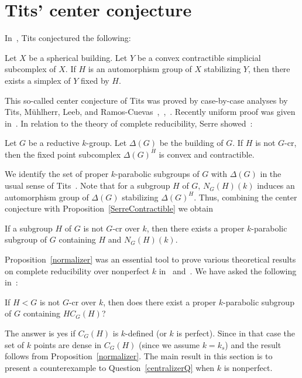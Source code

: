 \section{Tits' center conjecture}
In~\cite{Tits-colloq}, Tits conjectured the following:
\begin{con}\label{centerconjecture}
Let $X$ be a spherical building. Let $Y$ be a convex contractible simplicial subcomplex of $X$. If $H$ is an automorphism group of $X$ stabilizing $Y$, then there exists a simplex of $Y$ fixed by $H$.   
\end{con}
This so-called center conjecture of Tits was proved by case-by-case analyses by Tits, M\"{u}hlherr, Leeb, and Ramos-Cuevas~\cite{Leeb-Ramos-TCC-GFA},~\cite{Muhlherr-Tits-TCC-JAlgebra},~\cite{Ramos-centerconj-Geo}. Recently uniform proof was given in~\cite{Weiss-center-Fourier}. In relation to the theory of complete reducibility, Serre showed~\cite{Serre-building}:
\begin{prop}\label{SerreContractible}
Let $G$ be a reductive $k$-group. Let $\Delta(G)$ be the building of $G$. If $H$ is not $G$-cr, then the fixed point subcomplex $\Delta(G)^H$ is  convex and contractible. 
\end{prop}
We identify the set of proper $k$-parabolic subgroups of $G$ with $\Delta(G)$ in the usual sense of Tits~\cite{Tits-book}. Note that for a subgroup $H$ of $G$, $N_G(H)(k)$ induces an automorphism group of $\Delta(G)$ stabilizing $\Delta(G)^H$. Thus, combining the center conjecture with Proposition~\ref{SerreContractible} we obtain
\begin{prop}\label{normalizer}
If a subgroup $H$ of $G$ is not $G$-cr over $k$, then there exists a proper $k$-parabolic subgroup of $G$ containing $H$ and $N_G(H)(k)$. 
\end{prop}
Proposition~\ref{normalizer} was an essential tool to prove various theoretical results on complete reducibility over nonperfect $k$ in~\cite{Uchiyama-Nonperfectopenproblem-pre} and~\cite{Uchiyama-Nonperfect-pre}. We have asked the following in~\cite[Rem.~6.5]{Uchiyama-Nonperfectopenproblem-pre}:
\begin{question}\label{centralizerQ}
If $H<G$ is not $G$-cr over $k$, then does there exist a proper $k$-parabolic subgroup of $G$ containing $HC_G(H)$?
\end{question}
The answer is yes if $C_G(H)$ is $k$-defined (or $k$ is perfect). Since in that case the set of $k$ points are dense in $C_G(H)$ (since we assume $k=k_s$) and the result follows from Proposition~\ref{normalizer}. The main result in this section is to present a counterexample to Question~\ref{centralizerQ} when $k$ is nonperfect. 
